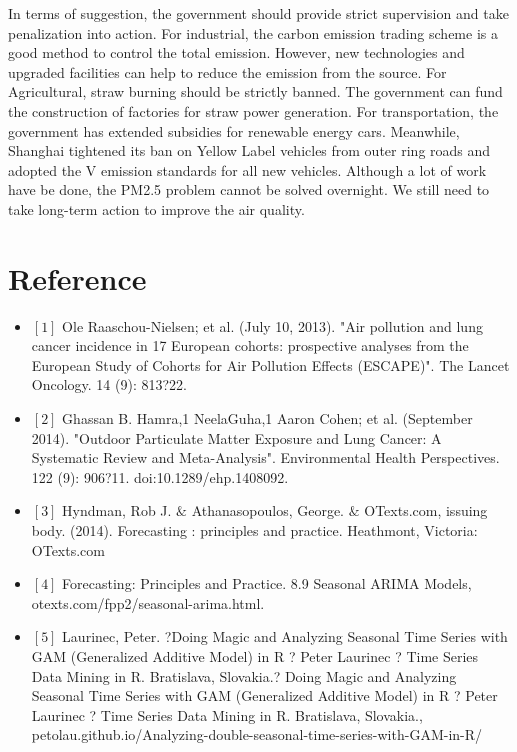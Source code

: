 \documentclass[11pt,]{article}
\begin{document}
In terms of suggestion, the government should provide strict supervision and take penalization into action. For industrial, the carbon emission trading scheme is a good method to control the total emission. However, new technologies and upgraded facilities can help to reduce the emission from the source. For Agricultural, straw burning should be strictly banned. The government can fund the construction of factories for straw power generation. For transportation, the government has extended subsidies for renewable energy cars. Meanwhile, Shanghai tightened its ban on Yellow Label vehicles from outer ring roads and adopted the V emission standards for all new vehicles. Although a lot of work have be done, the PM2.5 problem cannot be solved overnight. We still need to take long-term action to improve the air quality.

\pagebreak

\section{Reference}

\begin{itemize}

\item $[1]$ Ole Raaschou-Nielsen; et al. (July 10, 2013). "Air pollution and lung cancer incidence in 17 European cohorts: prospective analyses from the European Study of Cohorts for Air Pollution Effects (ESCAPE)". The Lancet Oncology. 14 (9): 813?22. 

\vspace{-2mm}
\item $[2]$ Ghassan B. Hamra,1 NeelaGuha,1 Aaron Cohen; et al. (September 2014). "Outdoor Particulate Matter Exposure and Lung Cancer: A Systematic Review and Meta-Analysis". Environmental Health Perspectives. 122 (9): 906?11. doi:10.1289/ehp.1408092.

\vspace{-2mm}
\item $[3]$ Hyndman, Rob J. $\&$ Athanasopoulos, George. $\&$ OTexts.com, issuing body.  (2014). Forecasting : principles and practice. Heathmont, Victoria:  OTexts.com
\vspace{-2mm}

\item $[4]$ Forecasting: Principles and Practice. 8.9 Seasonal ARIMA Models, otexts.com/fpp2/seasonal-arima.html.

\vspace{-2mm}

\item $[5]$ Laurinec, Peter. ?Doing Magic and Analyzing Seasonal Time Series with GAM (Generalized Additive Model) in R ? Peter Laurinec ? Time Series Data Mining in R. Bratislava, Slovakia.? Doing Magic and Analyzing Seasonal Time Series with GAM (Generalized Additive Model) in R ? Peter Laurinec ? Time Series Data Mining in R. Bratislava, Slovakia., petolau.github.io/Analyzing-double-seasonal-time-series-with-GAM-in-R/

\end{itemize}
\end{document}
